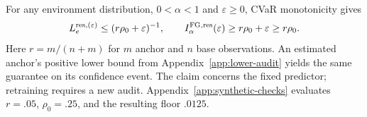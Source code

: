 For any environment distribution, $0<\alpha<1$ and $\varepsilon\ge0$, CVaR monotonicity gives
\begin{equation}
L_e^{\mathrm{res},(\varepsilon)}\le(r\rho_0+\varepsilon)^{-1},
\qquad I_\alpha^{\mathrm{FG},\mathrm{res}}(\varepsilon)\ge r\rho_0+\varepsilon\ge r\rho_0.
\label{eq:reserve-certificate-bound}
\end{equation}
Here $r=m/(n+m)$ for $m$ anchor and $n$ base observations. An estimated anchor's positive lower bound from Appendix~\ref{app:lower-audit} yields the same guarantee on its confidence event. The claim concerns the fixed predictor; retraining requires a new audit. Appendix~\ref{app:synthetic-checks} evaluates $r=.05$, $\rho_0=.25$, and the resulting floor $.0125$.
